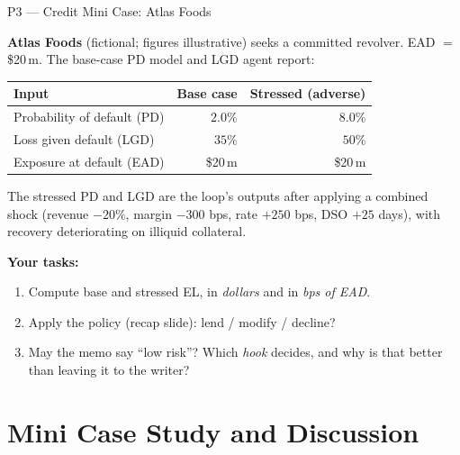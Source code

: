 \documentclass[9pt,t]{beamer}
\begin{document}
\begin{frame}{P3 --- Credit Mini Case: Atlas Foods}

\textbf{Atlas Foods} (fictional; figures illustrative) seeks a committed revolver.
\alert{EAD $=$ \$20\,m.} The base-case PD model and LGD agent report:

\medskip
\begin{tabular}{@{}lrr@{}}
\toprule
Input & Base case & Stressed (adverse) \\
\midrule
Probability of default (PD) & $2.0\%$ & $8.0\%$ \\
Loss given default (LGD) & $35\%$ & $50\%$ \\
Exposure at default (EAD) & \$20\,m & \$20\,m \\
\bottomrule
\end{tabular}

\medskip
The stressed PD and LGD are the loop's outputs after applying a combined shock
(revenue $-20\%$, margin $-300$ bps, rate $+250$ bps, DSO $+25$ days), with
recovery deteriorating on illiquid collateral.

\medskip
\textbf{Your tasks:}
\begin{enumerate}
  \item Compute base and stressed EL, in \emph{dollars} and in \emph{bps of EAD}.
  \item Apply the policy (recap slide): lend / modify / decline?
  \item May the memo say ``low risk''? Which \emph{hook} decides, and why is that
        better than leaving it to the writer?
\end{enumerate}
\end{frame}

\section{Mini Case Study and Discussion}
\end{document}

